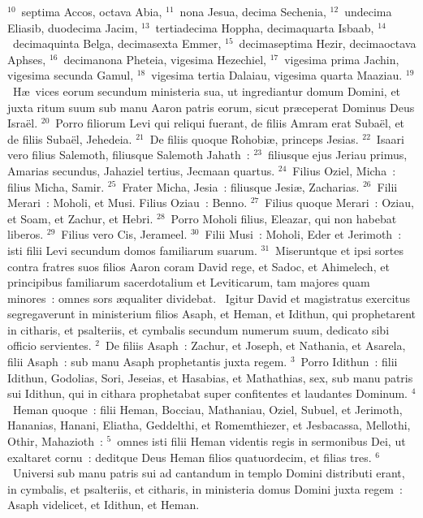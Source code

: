 ${}^{10}$~septima Accos, octava Abia,
${}^{11}$~nona Jesua, decima Sechenia,
${}^{12}$~undecima Eliasib, duodecima Jacim,
${}^{13}$~tertiadecima Hoppha, decimaquarta Isbaab,
${}^{14}$~decimaquinta Belga, decimasexta Emmer,
${}^{15}$~decimaseptima Hezir, decimaoctava Aphses,
${}^{16}$~decimanona Pheteia, vigesima Hezechiel,
${}^{17}$~vigesima prima Jachin, vigesima secunda Gamul,
${}^{18}$~vigesima tertia Dalaiau, vigesima quarta Maaziau.
${}^{19}$~H\ae\ vices eorum secundum ministeria sua, ut ingrediantur domum Domini, et juxta ritum suum sub manu Aaron patris eorum, sicut pr\ae ceperat Dominus Deus Isra\"el.
${}^{20}$~Porro filiorum Levi qui reliqui fuerant, de filiis Amram erat Suba\"el, et de filiis Suba\"el, Jehedeia.
${}^{21}$~De filiis quoque Rohobi\ae , princeps Jesias.
${}^{22}$~Isaari vero filius Salemoth, filiusque Salemoth Jahath~:
${}^{23}$~filiusque ejus Jeriau primus, Amarias secundus, Jahaziel tertius, Jecmaan quartus.
${}^{24}$~Filius Oziel, Micha~: filius Micha, Samir.
${}^{25}$~Frater Micha, Jesia~: filiusque Jesi\ae , Zacharias.
${}^{26}$~Filii Merari~: Moholi, et Musi. Filius Oziau~: Benno.
${}^{27}$~Filius quoque Merari~: Oziau, et Soam, et Zachur, et Hebri.
${}^{28}$~Porro Moholi filius, Eleazar, qui non habebat liberos.
${}^{29}$~Filius vero Cis, Jerameel.
${}^{30}$~Filii Musi~: Moholi, Eder et Jerimoth~: isti filii Levi secundum domos familiarum suarum.
${}^{31}$~Miseruntque et ipsi sortes contra fratres suos filios Aaron coram David rege, et Sadoc, et Ahimelech, et principibus familiarum sacerdotalium et Leviticarum, tam majores quam minores~: omnes sors \ae qualiter dividebat.
~Igitur David et magistratus exercitus segregaverunt in ministerium filios Asaph, et Heman, et Idithun, qui prophetarent in citharis, et psalteriis, et cymbalis secundum numerum suum, dedicato sibi officio servientes.
${}^{2}$~De filiis Asaph~: Zachur, et Joseph, et Nathania, et Asarela, filii Asaph~: sub manu Asaph prophetantis juxta regem.
${}^{3}$~Porro Idithun~: filii Idithun, Godolias, Sori, Jeseias, et Hasabias, et Mathathias, sex, sub manu patris sui Idithun, qui in cithara prophetabat super confitentes et laudantes Dominum.
${}^{4}$~Heman quoque~: filii Heman, Bocciau, Mathaniau, Oziel, Subuel, et Jerimoth, Hananias, Hanani, Eliatha, Geddelthi, et Romemthiezer, et Jesbacassa, Mellothi, Othir, Mahazioth~:
${}^{5}$~omnes isti filii Heman videntis regis in sermonibus Dei, ut exaltaret cornu~: deditque Deus Heman filios quatuordecim, et filias tres.
${}^{6}$~Universi sub manu patris sui ad cantandum in templo Domini distributi erant, in cymbalis, et psalteriis, et citharis, in ministeria domus Domini juxta regem~: Asaph videlicet, et Idithun, et Heman.
